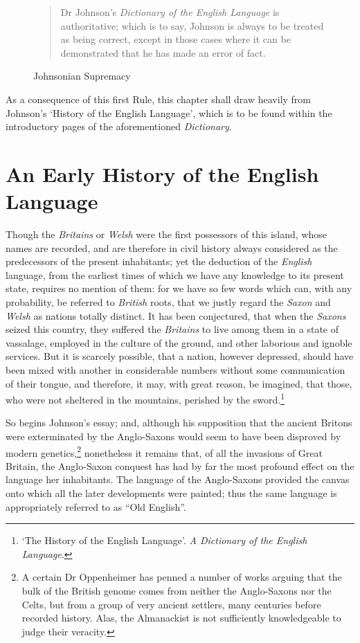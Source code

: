 \documentclass[0main.tex]{subfiles}
\begin{document}
\begin{figure}[h]
\caption{Johnsonian Supremacy}
\begin{quote}
Dr Johnson's \emph{Dictionary of the English Language} is authoritative; which is to say, Johnson is always to be treated as being correct, except in those cases where it can be demonstrated that he has made an error of fact.
\end{quote}
\end{figure}

As a consequence of this first Rule, this chapter shall draw heavily from Johnson's `History of the English Language', which is to be found within the introductory pages of the aforementioned \emph{Dictionary}.

\bigskip

\section{An Early History of the English Language}

{\footnotesize Though the \emph{Britains} or \emph{Welsh} were the first possessors of this island, whose names are recorded, and are therefore in civil history always considered as the predecessors of the present inhabitants; yet the deduction of the \emph{English} language, from the earliest times of which we have any knowledge to its present state, requires no mention of them: for we have so few words which can, with any probability, be referred to \emph{British} roots, that we justly regard the \emph{Saxon} and \emph{Welsh} as nations totally distinct. It has been conjectured, that when the \emph{Saxons} seized this country, they suffered the \emph{Britains} to live among them in a state of vassalage, employed in the culture of the ground, and other laborious and ignoble services. But it is scarcely possible, that a nation, however depressed, should have been mixed with another in considerable numbers without some communication of their tongue, and therefore, it may, with great reason, be imagined, that those, who were not sheltered in the mountains, perished by the sword.\footnote{`The History of the English Language'. \emph{A Dictionary of the English Language}.}}

\bigskip

So begins Johnson's essay; and, although his supposition that the ancient Britons were exterminated by the Anglo-Saxons would seem to have been disproved by modern genetics,\footnote{A certain Dr Oppenheimer has penned a number of works arguing that the bulk of the British genome comes from neither the Anglo-Saxons nor the Celts, but from a group of very ancient settlers, many centuries before recorded history. Alas, the Almanackist is not sufficiently knowledgeable to judge their veracity.} nonetheless it remains that, of all the invasions of Great Britain, the Anglo-Saxon conquest has had by far the most profound effect on the language her inhabitants. The language of the Anglo-Saxons provided the canvas onto which all the later developments were painted; thus the same language is appropriately referred to as ``Old English''.
\end{document}
